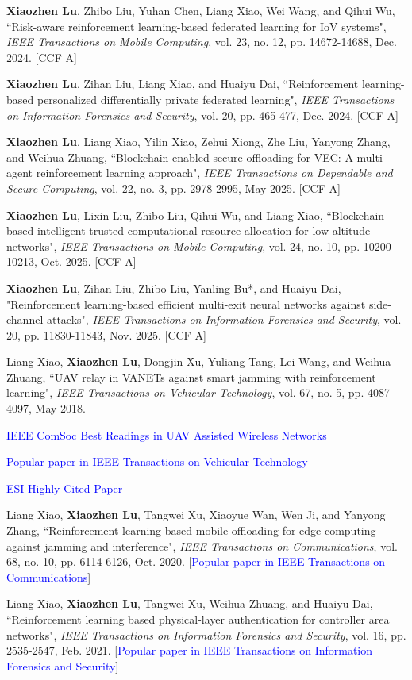\documentclass{article}
\begin{document}
\begin{justifying}
\begin{myreferences}
 \item \textbf{Xiaozhen Lu}, Zhibo Liu, Yuhan Chen, Liang Xiao, Wei Wang, and Qihui Wu, ``Risk-aware reinforcement learning-based federated learning for IoV systems", \emph{IEEE Transactions on Mobile Computing}, vol. 23, no. 12, pp. 14672-14688, Dec. 2024. [CCF A]
 \item \textbf{Xiaozhen Lu}, Zihan Liu, Liang Xiao, and Huaiyu Dai, ``Reinforcement learning-based personalized differentially private federated learning", \emph{IEEE Transactions on Information Forensics and Security}, vol. 20, pp. 465-477, Dec. 2024. [CCF A]
 \item \textbf{Xiaozhen Lu}, Liang Xiao, Yilin Xiao, Zehui Xiong, Zhe Liu, Yanyong Zhang, and Weihua Zhuang, ``Blockchain-enabled secure offloading for VEC: A multi-agent reinforcement learning approach", \emph{IEEE Transactions on Dependable and Secure Computing}, vol. 22, no. 3, pp. 2978-2995, May 2025. [CCF A]
 \item \textbf{Xiaozhen Lu}, Lixin Liu, Zhibo Liu, Qihui Wu, and Liang Xiao, ``Blockchain-based intelligent trusted computational resource allocation for low-altitude networks", \emph{IEEE Transactions on Mobile Computing}, vol. 24, no. 10, pp. 10200-10213, Oct. 2025. [CCF A]
 \item \textbf{Xiaozhen Lu}, Zihan Liu, Zhibo Liu, Yanling Bu*, and Huaiyu Dai, "Reinforcement learning-based efficient multi-exit neural networks against side-channel attacks", \emph{IEEE Transactions on Information Forensics and Security}, vol. 20, pp. 11830-11843, Nov. 2025. [CCF A]
 
 \item Liang Xiao, \textbf{Xiaozhen Lu}, Dongjin Xu, Yuliang Tang, Lei Wang, and Weihua Zhuang, ``UAV relay in VANETs against smart jamming with reinforcement learning", \emph{IEEE Transactions on Vehicular Technology}, vol. 67, no. 5, pp. 4087-4097, May 2018.
 \begin{subitems}
 	\item \textcolor{blue}{IEEE ComSoc Best Readings in UAV Assisted Wireless Networks}
 	\item \textcolor{blue}{Popular paper in IEEE Transactions on Vehicular Technology}
 	\item \textcolor{blue}{ESI Highly Cited Paper}
 \end{subitems}
 \item Liang Xiao, \textbf{Xiaozhen Lu}, Tangwei Xu, Xiaoyue Wan, Wen Ji, and Yanyong Zhang, ``Reinforcement learning-based mobile offloading for edge computing against jamming and interference", \emph{IEEE Transactions on Communications}, vol. 68, no. 10, pp. 6114-6126, Oct. 2020. [\textcolor{blue}{Popular paper in IEEE Transactions on Communications}]
 \item Liang Xiao, \textbf{Xiaozhen Lu}, Tangwei Xu, Weihua Zhuang, and Huaiyu Dai, ``Reinforcement learning based physical-layer authentication for controller area networks", \emph{IEEE Transactions on Information Forensics and Security}, vol. 16, pp. 2535-2547, Feb. 2021. [\textcolor{blue}{Popular paper in IEEE Transactions on Information Forensics and Security}]
 

\end{myreferences}
\end{justifying}
\end{document}
